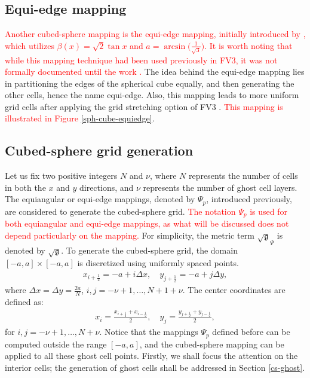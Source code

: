\documentclass[preprint,12pt]{elsarticle}
\begin{document}
\begin{linenumbers}
\subsection{Equi-edge mapping}
\label{cs-equiedge}
\textcolor{red}{
Another cubed-sphere mapping is the equi-edge mapping, initially introduced by \cite{chen:2021}, which utilizes $\beta(x) = \sqrt{2}\tan{x}$ and $a=\arcsin{\big(\frac{1}{\sqrt{3}}\big)}$. It is worth noting that while this mapping technique had been used previously in FV3, it was not formally documented until the work \cite{chen:2021}.}
The idea behind the equi-edge mapping lies in partitioning the edges of the spherical cube equally,
and then generating the other cells, hence the name equi-edge.
Also, this mapping leads to more uniform grid cells after applying the grid stretching option of FV3 \citep{harris:2016, chen:2021}.
\textcolor{red}{This mapping is illustrated in Figure \ref{sph-cube-equiedge}}.

\subsection{Cubed-sphere grid generation}
\label{cs-grid}
Let us fix two positive integers $N$ and $\nu$, where $N$ represents the number of cells in both the $x$ and $y$ directions, and $\nu$ represents the number of ghost cell layers. 
The equiangular or equi-edge mappings, denoted by $\Psi_p$, introduced previously, are considered to generate the cubed-sphere grid.
\textcolor{red}{The notation $\Psi_p$ is used for both equiangular and equi-edge mappings, as what will be discussed does not depend particularly on the mapping.}
For simplicity, the metric term $\sqrt{\mathfrak{g}}_{\Psi}$ is denoted by $\sqrt{\mathfrak{g}}$.
To generate the cubed-sphere grid, the domain $[-a,a]\times[-a,a]$ is discretized using uniformly spaced points.
\begin{align}
\label{edge-coords}
x_{i+\frac{1}{2}} = -a+i\Delta x, \quad
y_{j+\frac{1}{2}} = -a+j\Delta y,
\end{align}
where $\Delta x = \Delta y = \frac{2a}{N}$, $i,j=-\nu+1,\ldots,N+1+\nu$. The center coordinates  are defined as:
\begin{align}
	\label{center-coords}
	x_{i} = \frac{x_{i+\frac{1}{2}}+x_{i-\frac{1}{2}}}{2}, \quad
	y_{j} = \frac{y_{j+\frac{1}{2}}+y_{j-\frac{1}{2}}}{2},
\end{align}
for $i,j=-\nu+1,\ldots,N+\nu$.
Notice that the mappings ${\Psi}_p$ defined before can be computed outside the range $[-a,a]$, and the cubed-sphere mapping can be applied to all these ghost cell points.
Firstly, we shall focus the attention on the interior cells; the generation of ghost cells shall be addressed in Section \ref{cs-ghost}.


\end{linenumbers}
\end{document}
